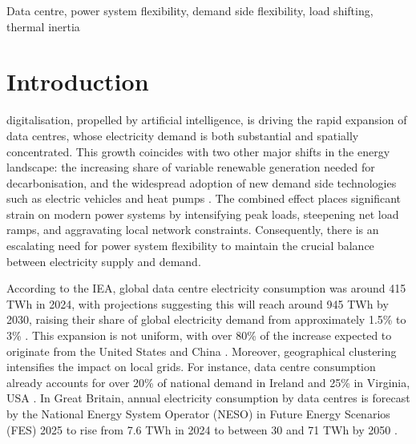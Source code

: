 \documentclass[lettersize,journal]{IEEEtran}
\providecommand{\DIFadd}[1]{{\color{blue}#1}}
\providecommand{\DIFaddbegin}{}
\providecommand{\DIFaddend}{}
\begin{document}
\begin{IEEEkeywords}
Data  \DIFaddbegin \DIFadd{centre, power }\DIFaddend system flexibility,  \DIFaddbegin \DIFadd{demand }\DIFaddend side flexibility,  \DIFaddbegin \DIFadd{load shifting, thermal inertia
}\DIFaddend \end{IEEEkeywords}

\section{Introduction}

 digitalisation, propelled by artificial intelligence, is driving the rapid expansion of data centres, whose electricity demand is both substantial and spatially concentrated. This growth coincides with two other major shifts in the energy landscape: the increasing share of variable renewable generation needed for decarbonisation, and the widespread adoption of new  \DIFaddbegin \DIFadd{demand side }\DIFaddend technologies such as electric vehicles and heat pumps \cite{Centrica2020LEM, EEAACER2023Flex}. The combined effect places significant strain on modern power systems by intensifying peak loads, steepening net load ramps, and aggravating local network constraints. Consequently, there is an escalating need for power system flexibility to maintain the crucial balance between electricity supply and demand.

According to the IEA, global data centre electricity consumption was around 415 TWh in 2024, with projections suggesting this will  \DIFaddbegin \DIFadd{reach around }\DIFaddend 945 TWh by 2030, raising their share of global electricity demand from approximately 1.5\% to 3\% \cite{iea_energy_ai}. This expansion is not uniform, with over 80\% of the increase expected to originate from the United States and China \cite{iea_energy_ai}. Moreover, geographical clustering intensifies the impact on local grids. For instance, data centre consumption already accounts for over 20\% of national demand in Ireland  and 25\% in Virginia, USA \cite{iea_energy_ai}. In Great Britain, annual electricity consumption by data centres is forecast by  \DIFaddbegin \DIFadd{the National Energy System Operator (NESO) in Future Energy Scenarios (FES) 2025 }\DIFaddend to rise from 7.6 TWh in 2024 to between 30  \DIFaddbegin \DIFadd{and }\DIFaddend 71 TWh by 2050 \cite{neso2025future}.
\end{document}
